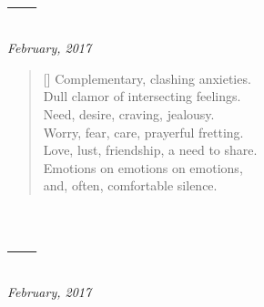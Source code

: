 \section{---}

\hfill\textit{February, 2017}

\begin{verse}[\textwidth]
  Complementary, clashing anxieties.\\
  Dull clamor of intersecting feelings.\\
  Need, desire, craving, jealousy.\\
  Worry, fear, care, prayerful fretting.\\
  Love, lust, friendship, a need to share.\\
  Emotions on emotions on emotions,\\
  and, often, comfortable silence.
\end{verse}
\newpage

\section{---}

\hfill\textit{February, 2017}

